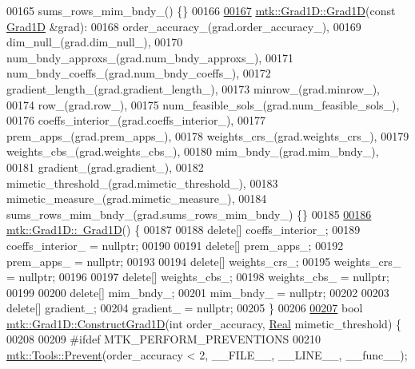 \begin{DoxyCode}
00165   sums\_rows\_mim\_bndy\_() \{\}
00166 
\hypertarget{mtk__grad__1d_8cc_source_l00167}{}\hyperlink{classmtk_1_1Grad1D_a5708bcb61bde3f7f3a4ddede191d82a4}{00167} \hyperlink{classmtk_1_1Grad1D_ae21e6ac2652e653c48f15b304ee83a75}{mtk::Grad1D::Grad1D}(\textcolor{keyword}{const} \hyperlink{classmtk_1_1Grad1D}{Grad1D} &grad):
00168   order\_accuracy\_(grad.order\_accuracy\_),
00169   dim\_null\_(grad.dim\_null\_),
00170   num\_bndy\_approxs\_(grad.num\_bndy\_approxs\_),
00171   num\_bndy\_coeffs\_(grad.num\_bndy\_coeffs\_),
00172   gradient\_length\_(grad.gradient\_length\_),
00173   minrow\_(grad.minrow\_),
00174   row\_(grad.row\_),
00175   num\_feasible\_sols\_(grad.num\_feasible\_sols\_),
00176   coeffs\_interior\_(grad.coeffs\_interior\_),
00177   prem\_apps\_(grad.prem\_apps\_),
00178   weights\_crs\_(grad.weights\_crs\_),
00179   weights\_cbs\_(grad.weights\_cbs\_),
00180   mim\_bndy\_(grad.mim\_bndy\_),
00181   gradient\_(grad.gradient\_),
00182   mimetic\_threshold\_(grad.mimetic\_threshold\_),
00183   mimetic\_measure\_(grad.mimetic\_measure\_),
00184   sums\_rows\_mim\_bndy\_(grad.sums\_rows\_mim\_bndy\_) \{\}
00185 
\hypertarget{mtk__grad__1d_8cc_source_l00186}{}\hyperlink{classmtk_1_1Grad1D_a2f9b1d306c0f09f36145bb1e7e486b54}{00186} \hyperlink{classmtk_1_1Grad1D_a2f9b1d306c0f09f36145bb1e7e486b54}{mtk::Grad1D::~Grad1D}() \{
00187 
00188   \textcolor{keyword}{delete}[] coeffs\_interior\_;
00189   coeffs\_interior\_ = \textcolor{keyword}{nullptr};
00190 
00191   \textcolor{keyword}{delete}[] prem\_apps\_;
00192   prem\_apps\_ = \textcolor{keyword}{nullptr};
00193 
00194   \textcolor{keyword}{delete}[] weights\_crs\_;
00195   weights\_crs\_ = \textcolor{keyword}{nullptr};
00196 
00197   \textcolor{keyword}{delete}[] weights\_cbs\_;
00198   weights\_cbs\_ = \textcolor{keyword}{nullptr};
00199 
00200   \textcolor{keyword}{delete}[] mim\_bndy\_;
00201   mim\_bndy\_ = \textcolor{keyword}{nullptr};
00202 
00203   \textcolor{keyword}{delete}[] gradient\_;
00204   gradient\_ = \textcolor{keyword}{nullptr};
00205 \}
00206 
\hypertarget{mtk__grad__1d_8cc_source_l00207}{}\hyperlink{classmtk_1_1Grad1D_a74ef5245cfae6fd158bd7f563a0c2e52}{00207} \textcolor{keywordtype}{bool} \hyperlink{classmtk_1_1Grad1D_a74ef5245cfae6fd158bd7f563a0c2e52}{mtk::Grad1D::ConstructGrad1D}(\textcolor{keywordtype}{int} order\_accuracy, 
      \hyperlink{group__c01-roots_gac080bbbf5cbb5502c9f00405f894857d}{Real} mimetic\_threshold) \{
00208 
00209 \textcolor{preprocessor}{  #ifdef MTK\_PERFORM\_PREVENTIONS}
00210   \hyperlink{classmtk_1_1Tools_a332324c6f25e66be9dff48c5987a3b9f}{mtk::Tools::Prevent}(order\_accuracy < 2, \_\_FILE\_\_, \_\_LINE\_\_, \_\_func\_\_);

\end{DoxyCode}
